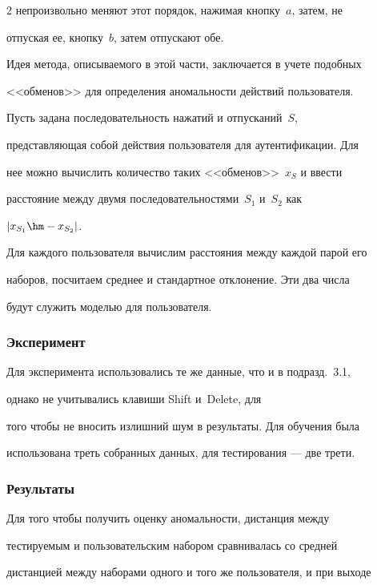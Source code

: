\begin{multicols}{2}
непроизвольно меняют этот порядок, нажимая кнопку~$a$, затем, не

отпуская ее, кнопку~$b$, затем отпускают обе.



Идея метода, описываемого в этой части, заключается в учете подобных

<<обменов>> для определения аномальности действий пользователя.



Пусть задана последовательность нажатий и отпусканий~$S$,

представляющая собой действия пользователя для аутентификации. Для

нее можно вычислить количество таких <<обменов>>~$x_S$ и ввести

расстояние между двумя последовательностями~$S_1$ и~$S_2$ как

$|x_{S_1}\hm - x_{S_2}|$.



Для каждого пользователя вычислим расстояния между каждой парой его

наборов, посчитаем среднее и стандартное отклонение. Эти два числа

будут служить моделью для пользователя.



\subsubsection{Эксперимент}



Для эксперимента использовались те же данные, что и в подразд.~3.1,

однако не учитывались клавиши {\sf Shift} и~{\sf Delete}, для

того чтобы не вносить излишний шум в результаты. Для обучения была

использована треть собранных данных, для тестирования --- две трети.



\subsubsection{Результаты}



Для того чтобы получить оценку аномаль\-ности, дистанция между

тестируемым и пользовательским набором сравнивалась со средней

дистанцией между наборами одного и того же пользователя, и при выходе


\end{multicols}
